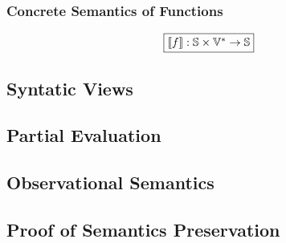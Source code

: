 \subsubsection{Concrete Semantics of Functions}

\[
  \framebox{$\sem{\func}: \stset \times \valset^* \rightarrow \stset$}
\]

\todo

\subsection{Syntatic Views}

\todo

\subsection{Partial Evaluation}

\todo

\subsection{Observational Semantics}

\todo

\subsection{Proof of Semantics Preservation}

\todo
